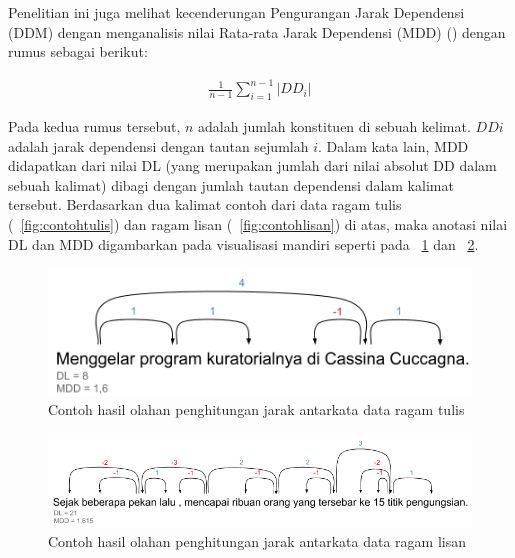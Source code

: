Penelitian ini juga melihat kecenderungan Pengurangan Jarak Dependensi (DDM) dengan menganalisis nilai Rata-rata Jarak Dependensi (MDD) (\citealp{liu2008dependency, liu2017dependency}) dengan rumus sebagai berikut:

\noindent \begin{align}\label{eq:bola}
	\frac{1}{n-1} \displaystyle\sum_{i=1}^{n-1} |DD_i|
\end{align}

Pada kedua rumus tersebut, $n$ adalah jumlah konstituen di sebuah kelimat. $DDi$ adalah jarak dependensi dengan tautan sejumlah $i$. Dalam kata lain, MDD didapatkan dari nilai DL (yang merupakan jumlah dari nilai absolut DD dalam sebuah kalimat) dibagi dengan jumlah tautan dependensi dalam kalimat tersebut. Berdasarkan dua kalimat contoh dari data ragam tulis (\pic~\ref{fig:contohtulis}) dan ragam lisan (\pic~\ref{fig:contohlisan}) di atas, maka anotasi nilai DL dan MDD digambarkan pada visualisasi mandiri seperti pada \pic~\ref{fig:contohtulis_DLMDD} dan \pic~\ref{fig:contohlisan_DLMDD}.

\begin{figure}
	\centering \includegraphics[width=0.5
	\textwidth] {pics/contohtulis_DLMDD.png} \caption{Contoh hasil olahan penghitungan jarak antarkata data ragam tulis} 
\label{fig:contohtulis_DLMDD} 
\end{figure}

\begin{figure}
	\centering \includegraphics[width=0.85
	\textwidth] {pics/contohlisan_DLMDD.png} \caption{Contoh hasil olahan penghitungan jarak antarkata data ragam lisan} 
\label{fig:contohlisan_DLMDD} 
\end{figure}

